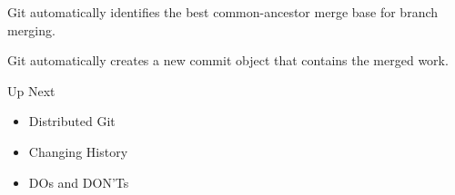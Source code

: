 \documentclass{beamer}
\begin{document}
\begin{frame}{Git automatically identifies the best common-ancestor merge base for branch merging.}
    \centering
    \hfill\vfill
\end{frame}

\begin{frame}{Git automatically creates a new commit object that contains the merged work.}
    \centering
    \hfill\vfill
\end{frame}

\begin{frame}{Up Next}
  \begin{itemize}
  \item
    Distributed Git
  \item
    Changing History
  \item
    DOs and DON'Ts
  \end{itemize}
\end{frame}
\end{document}
